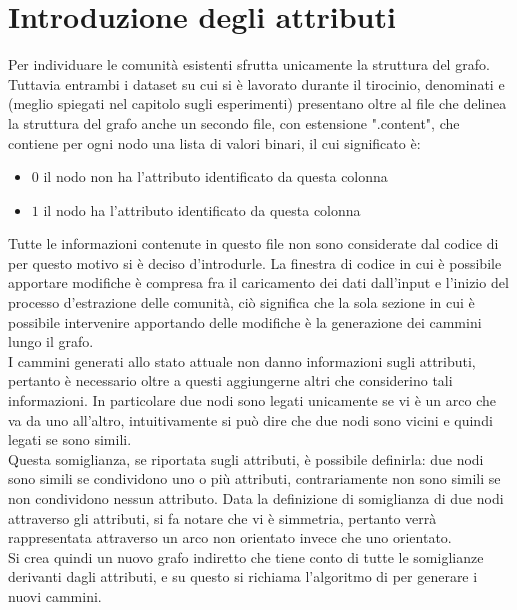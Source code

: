 \section{Introduzione degli attributi}
Per individuare le comunità esistenti \cnrl sfrutta unicamente la struttura del grafo.\\
Tuttavia entrambi i dataset su cui si è lavorato durante il tirocinio, denominati \cora e \citeseer (meglio spiegati nel capitolo sugli esperimenti) presentano oltre al file che delinea la struttura del grafo anche un secondo file, con estensione ".content", che contiene per ogni nodo una lista di valori binari, il cui significato è:
\begin{itemize}
	\item $0$ il nodo non ha l'attributo identificato da questa colonna
	\item $1$ il nodo ha l'attributo identificato da questa colonna
\end{itemize}
%
Tutte le informazioni contenute in questo file non sono considerate dal codice di \cnrl per questo motivo si è deciso d'introdurle. La finestra di codice in cui è possibile apportare modifiche è compresa fra il caricamento dei dati dall'input e l'inizio del processo d'estrazione delle comunità, ciò significa che la sola sezione in cui è possibile intervenire apportando delle modifiche è la generazione dei cammini lungo il grafo.\\
I cammini generati allo stato attuale non danno informazioni sugli attributi, pertanto è necessario oltre a questi aggiungerne altri che considerino tali informazioni. In particolare due nodi sono legati unicamente se vi è un arco che va da uno all'altro, intuitivamente si può dire che due nodi sono vicini e quindi legati se sono simili.\\
Questa somiglianza, se riportata sugli attributi, è possibile definirla: due nodi sono simili se condividono uno o più attributi, contrariamente non sono simili se non condividono nessun attributo. Data la definizione di somiglianza di due nodi attraverso gli attributi, si fa notare che vi è simmetria, pertanto verrà rappresentata attraverso un arco non orientato invece che uno orientato.\\
Si crea quindi un nuovo grafo indiretto che tiene conto di tutte le somiglianze derivanti dagli attributi, e su questo si richiama l'algoritmo di \nv per generare i nuovi cammini.
%
